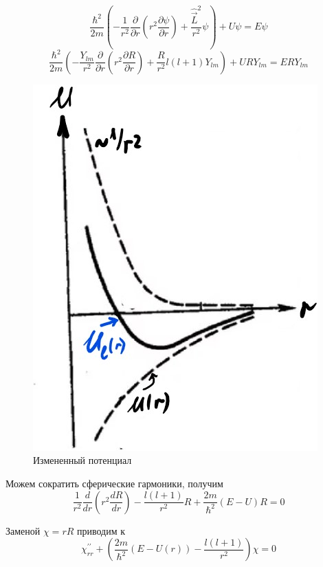 $$\frac{\hbar^2}{2m} \left(- \frac{1}{r^2}\frac{\partial}{\partial r}\left(r^2  \frac{\partial \psi}{\partial r} \right) + \frac{\hat{\vec{L}}^2}{r^2}\psi  \right) + U \psi = E \psi $$
$$\frac{\hbar^2}{2m} \left( - \frac{Y_{lm}}{r^2}\frac{\partial}{\partial r} \left(r^2  \frac{\partial R}{\partial r} \right) +  \frac{R}{r^2} l(l+1) Y_{lm} \right) + U RY_{lm}= E RY_{lm}$$
\par \begin{figure} 
\vspace{-2ex}
\centering
\includegraphics[width=1\linewidth]{pictures/27.1.jpg}
\caption{Измененный потенциал}
\end{figure}
\par Можем сократить сферические гармоники, получим
$$  \frac{1}{r^2}\frac{d}{d r} \left(r^2  \frac{d R}{d r} \right) -  \frac{l(l+1)}{r^2} R + \frac{2m}{\hbar^2} (E-U)R =0$$
\par Заменой $\chi = r R$ приводим к 
$$\chi^{\prime \prime}_{rr} + \left(\frac{2m}{\hbar^2} (E-U(r)) - \frac{l(l+1)}{r^2} \right) \chi =0$$

